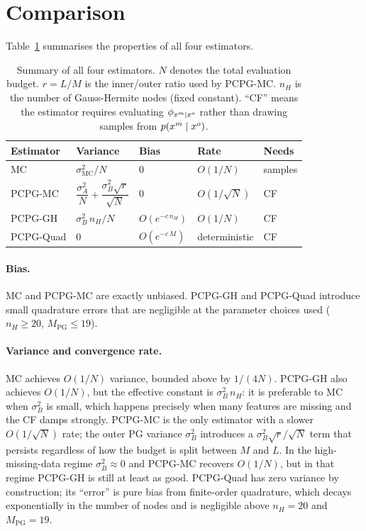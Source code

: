 \section{Comparison}
\label{sec:comparison}

Table~\ref{tab:estimator-comparison} summarises the properties of all four
estimators.

\begin{table}[ht]
\centering
\caption{Summary of all four estimators. $N$ denotes the total evaluation
budget. $r = L/M$ is the inner/outer ratio used by PCPG-MC.
$n_H$ is the number of Gauss-Hermite nodes (fixed constant).
``CF'' means the estimator requires evaluating $\phi_{x^m\mid x^o}$
rather than drawing samples from $p(x^m \mid x^o)$.}
\label{tab:estimator-comparison}
\renewcommand{\arraystretch}{1.4}
\begin{tabular}{lllll}
\hline
\textbf{Estimator} & \textbf{Variance} & \textbf{Bias} & \textbf{Rate} & \textbf{Needs} \\
\hline
MC
  & $\sigma^2_{\mathrm{MC}}/N$
  & $0$
  & $O(1/N)$
  & samples \\
PCPG-MC
  & $\dfrac{\sigma^2_A}{N} + \dfrac{\sigma^2_B\sqrt{r}}{\sqrt{N}}$
  & $0$
  & $O(1/\sqrt{N})$
  & CF \\[6pt]
PCPG-GH
  & $\sigma^2_B\,n_H / N$
  & $O(e^{-c\,n_H})$
  & $O(1/N)$
  & CF \\
PCPG-Quad
  & $0$
  & $O(e^{-c\,M})$
  & deterministic
  & CF \\
\hline
\end{tabular}
\end{table}

\paragraph{Bias.}
MC and PCPG-MC are exactly unbiased. PCPG-GH and PCPG-Quad introduce small
quadrature errors that are negligible at the parameter choices used
($n_H \geq 20$, $M_{\mathrm{PG}} \leq 19$).

\paragraph{Variance and convergence rate.}
MC achieves $O(1/N)$ variance, bounded above by $1/(4N)$.
PCPG-GH also achieves $O(1/N)$, but the effective constant is $\sigma^2_B\,n_H$:
it is preferable to MC when $\sigma^2_B$ is small, which happens precisely when
many features are missing and the CF damps strongly.
PCPG-MC is the only estimator with a slower $O(1/\sqrt{N})$ rate; the outer PG
variance $\sigma^2_B$ introduces a $\sigma^2_B\sqrt{r}/\sqrt{N}$ term that
persists regardless of how the budget is split between $M$ and $L$.
In the high-missing-data regime $\sigma^2_B \approx 0$ and PCPG-MC recovers
$O(1/N)$, but in that regime PCPG-GH is still at least as good.
PCPG-Quad has zero variance by construction; its ``error'' is pure bias from
finite-order quadrature, which decays exponentially in the number of nodes and
is negligible above $n_H = 20$ and $M_{\mathrm{PG}} = 19$.

